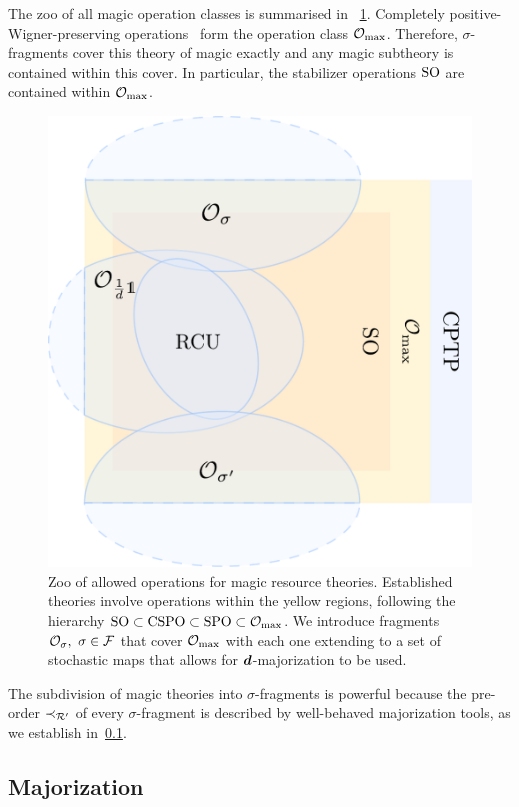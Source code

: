 \documentclass[pra,
aps,
twocolumn,
superscriptaddress,
groupedaddress,
nofootinbib,
reprint
]{revtex4-1}
\begin{document}
The zoo of all magic operation classes is summarised in ~\cref{fig:zoo}.
Completely positive-Wigner-preserving operations~\cite{cit:wang} form the operation class $\mathcal{O}_{\rm{}max}$.
Therefore, $\sigma$-fragments cover this theory of magic exactly and any magic subtheory is contained within this cover.
In particular, the stabilizer operations ${\rm{SO}}$ are contained within $\mathcal{O}_{\rm{}max}$.
\begin{figure}[t]
    \centering
        \includegraphics[scale=0.47
        ]{figs/operations.pdf}
    \caption{Zoo of allowed operations for magic resource theories.
    Established theories involve operations within the yellow regions, following the hierarchy ${\rm{SO}} \subset {\rm{CSPO}} \subset {\rm{SPO}} \subset \mathcal{O}_{\rm{}max}$.
    We introduce fragments $\mathcal{O}_\sigma,\ \sigma \in \mathcal{F}$ that cover $\mathcal{O}_{\rm{}max}$ with each one extending to a set of stochastic maps that allows for $\bm{d}$-majorization to be used.
    }
    \label{fig:zoo}
\end{figure}

The subdivision of magic theories into $\sigma$-fragments is powerful because the pre-order $\prec_{\mathcal{R}'}$ of every $\sigma$-fragment is described by well-behaved majorization tools, as we establish in~\cref{sec:major}. 

\subsection{Majorization}\label{sec:major}
\end{document}

